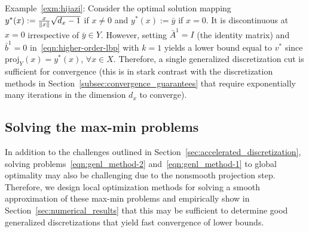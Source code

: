 \documentclass{article}
\DeclarePairedDelimiter\norm{\lVert}{\rVert}%
\newcommand{\1}[1]{\mathds{1}\left[#1\right]}
\begin{document}
\vspace*{0.1in}
\noindent Example~\ref{exm:hijazi}: 
Consider the optimal solution mapping $y^*(x) := \frac{x}{\norm{x}} \sqrt{d_x - 1}$ if $x \neq 0$ and $y^*(x) := \bar{y}$ if $x = 0$.
It is discontinuous at $x = 0$ irrespective of $\bar{y} \in Y$.
However, setting $\bar{A}^1 = I$ (the identity matrix) and $\bar{b}^1 = 0$ in~\eqref{eqn:higher-order-lbp} with $k = 1$ yields a lower bound equal to $v^*$ since $\text{proj}_{Y}(x) = y^*(x)$, $\forall x \in X$.
Therefore, a single generalized discretization cut is sufficient for convergence (this is in stark contrast with the discretization methods in Section~\ref{subsec:convergence_guarantees} that require exponentially many iterations in the dimension $d_x$ to converge).





















\subsection{Solving the max-min problems}

In addition to the challenges outlined in Section~\ref{sec:accelerated_discretization}, solving problems~\eqref{eqn:genl_method-2} and~\eqref{eqn:genl_method-1} to global optimality may also be challenging due to the non\-smooth projection step.
Therefore, we design local optimization methods for solving a smooth approximation of these max-min problems and empirically show in Section~\ref{sec:numerical_results} that this may be sufficient to determine good generalized discretizations that yield fast convergence of lower bounds.
\end{document}
